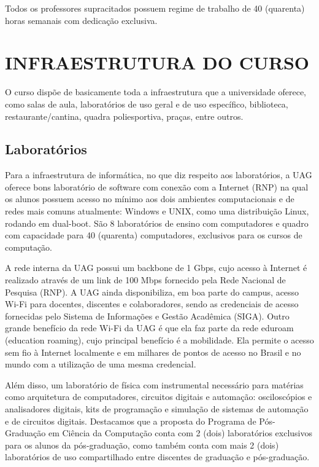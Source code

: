 \documentclass[
	12pt,				%
	openright,			%
  oneside,     %
	a4paper,			%
	chapter=TITLE,		%
	english,			%
	french,				%
	spanish,			%
	brazil				%
	]{abntex2}
\begin{document}
Todos os professores supracitados possuem regime de trabalho de 40 (quarenta) horas semanais com dedicação exclusiva.





%
%




\chapter{INFRAESTRUTURA DO CURSO}

O curso dispõe de basicamente toda a infraestrutura que a universidade oferece, como salas de aula, laboratórios de uso geral e de uso específico, biblioteca, restaurante/cantina, quadra poliesportiva, praças, entre outros. 

\section{Laboratórios}

Para a infraestrutura de informática, no que diz respeito aos laboratórios, a UAG oferece bons laboratório de software com conexão com a Internet (RNP) na qual os alunos possuem acesso no mínimo aos dois ambientes computacionais e de redes mais comuns atualmente: Windows e UNIX, como uma distribuição Linux, rodando em dual-boot. São 8 laboratórios de ensino com computadores e quadro com capacidade para 40 (quarenta) computadores, exclusivos para os cursos de computação.

A rede interna da UAG possui um backbone de 1 Gbps, cujo acesso à Internet é realizado através de um link de 100 Mbps fornecido pela Rede Nacional de Pesquisa (RNP). A UAG ainda disponibiliza, em boa parte do campus, acesso Wi-Fi para docentes, discentes e colaboradores, sendo as credenciais de acesso fornecidas pelo Sistema de Informações e Gestão Acadêmica (SIGA). Outro grande benefício da rede Wi-Fi da UAG é que ela faz parte da rede eduroam (education roaming), cujo principal benefício é a mobilidade. Ela permite o acesso sem fio à Internet localmente e em milhares de pontos de acesso no Brasil e no mundo com a utilização de uma mesma credencial.

Além disso, um laboratório de física com  instrumental necessário para matérias como arquitetura de computadores, circuitos digitais e automação: osciloscópios e analisadores digitais, kits de programação e simulação de sistemas de automação e de circuitos digitais. Destacamos que a proposta do Programa de Pós-Graduação em Ciência da Computação conta com 2 (dois) laboratórios exclusivos para os alunos da pós-graduação, como também conta com mais 2 (dois) laboratórios de uso compartilhado entre discentes de graduação e pós-graduação.
\end{document}
